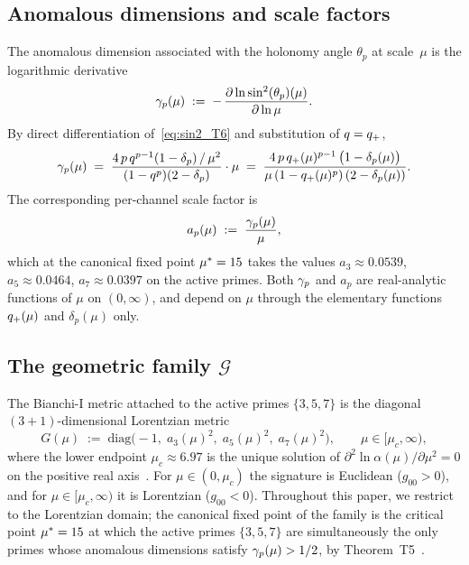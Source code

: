 \subsection{Anomalous dimensions and scale factors}
\label{ssec:gamma_a}

The anomalous dimension associated with the holonomy angle
$\theta_p$ at scale~$\mu$ is the logarithmic derivative
\begin{equation}
  \gamma_{p}(\mu)
  \;:=\;
  -\,\frac{\partial \ln \sin^2(\theta_{p})(\mu)}{\partial \ln \mu}.
  \label{eq:gamma_def}
\end{equation}
By direct differentiation of~\eqref{eq:sin2_T6} and substitution of
$q = q_{+}$,
\begin{equation}
  \gamma_{p}(\mu)
  \;=\;
  \frac{4\,p\,q^{p-1}(1 - \delta_p)\, /\, \mu^2}
       {(1 - q^p)(2 - \delta_p)} \cdot \mu
  \;=\;
  \frac{4\,p\,q_{+}(\mu)^{p-1}\,\bigl(1 - \delta_p(\mu)\bigr)}
       {\mu\,(1 - q_{+}(\mu)^p)\,(2 - \delta_p(\mu))}.
  \label{eq:gamma_explicit}
\end{equation}
The corresponding per-channel scale factor is
\begin{equation}
  a_p(\mu) \;:=\; \frac{\gamma_{p}(\mu)}{\mu},
  \label{eq:a_p_def}
\end{equation}
which at the canonical fixed point ${\mu^{*}} = 15$ takes the values
$a_3 \approx 0.0539$, $a_5 \approx 0.0464$,
$a_7 \approx 0.0397$ on the active primes. Both
$\gamma_{p}$ and $a_p$ are real-analytic functions of $\mu$ on
$(0, \infty)$, and depend on $\mu$ through the elementary functions
$q_{+}(\mu)$ and $\delta_p(\mu)$ only.

\subsection{The geometric family $\mathcal{G}$}
\label{ssec:G_family}

The Bianchi-I metric attached to the active primes
$\{3, 5, 7\}$ is the diagonal $(3+1)$-dimensional Lorentzian metric
\begin{equation}
  G(\mu) \;:=\;
  \mathrm{diag}\bigl(-1,\; a_3(\mu)^2,\; a_5(\mu)^2,\; a_7(\mu)^2\bigr),
  \qquad
  \mu \in [\mu_c, \infty),
  \label{eq:G_def_repeated}
\end{equation}
where the lower endpoint $\mu_c \approx 6.97$ is the unique solution
of $\partial^2 \ln \alpha(\mu) / \partial \mu^2 = 0$ on the
positive real axis~\cite[Ch.~12,~thm:HH]{PT_Monograph}. For
$\mu \in (0, \mu_c)$ the signature is Euclidean
($g_{00} > 0$), and for $\mu \in [\mu_c, \infty)$ it is Lorentzian
($g_{00} < 0$). Throughout this paper, we restrict to the
Lorentzian domain; the canonical fixed point of the family is the
critical point ${\mu^{*}} = 15$ at which the active primes
$\{3, 5, 7\}$ are simultaneously the only primes whose anomalous
dimensions satisfy $\gamma_{p}(\mu) > 1/2$, by
Theorem~T5~\cite[Ch.~8]{PT_Monograph}.

